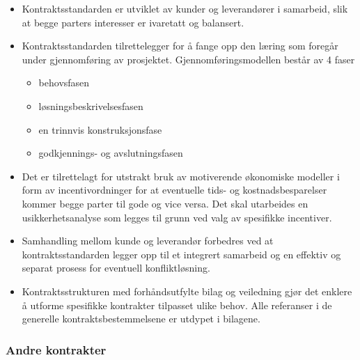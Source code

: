 \documentclass[11pt]{article}
\begin{document}
\begin{itemize}
\item Kontraktsstandarden er utviklet av kunder og leverandører i samarbeid, 
     slik at begge parters interesser er ivaretatt og balansert.
\item Kontraktsstandarden tilrettelegger for å fange opp den læring som foregår under gjennomføring av prosjektet. 
     Gjennomføringsmodellen består av 4 faser

\begin{itemize}
\item behovsfasen
\item løsningsbeskrivelsesfasen
\item en trinnvis konstruksjonsfase
\item godkjennings- og avslutningsfasen
\end{itemize}

\item Det er tilrettelagt for utstrakt bruk av motiverende økonomiske modeller i form av incentivordninger
     for at eventuelle tids- og kostnadsbesparelser kommer begge parter til gode og vice versa. 
     Det skal utarbeides en usikkerhetsanalyse som legges til grunn ved valg av spesifikke incentiver.
\item Samhandling mellom kunde og leverandør forbedres 
     ved at kontraktsstandarden legger opp til et integrert samarbeid 
     og en effektiv og separat prosess for eventuell konfliktløsning.
\item Kontraktsstrukturen med forhåndsutfylte bilag og veiledning gjør det enklere å utforme spesifikke kontrakter tilpasset ulike behov. 
     Alle referanser i de generelle kontraktsbestemmelsene er utdypet i bilagene.
\end{itemize}
\subsubsection{Andre kontrakter}
\label{sec-11.3.1}
\end{document}
